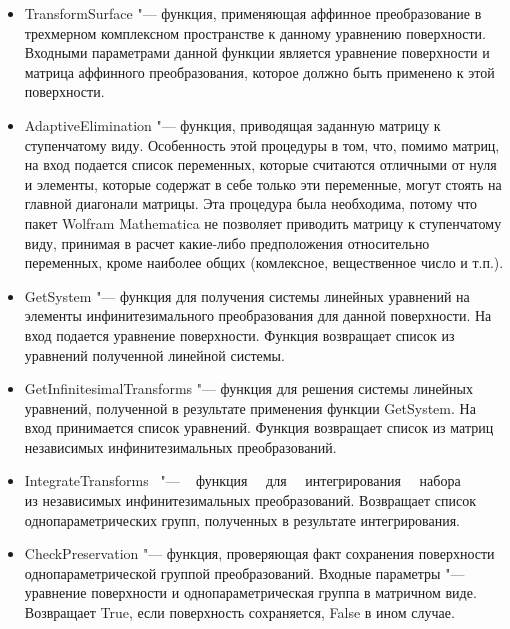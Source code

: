 \documentclass[../main.tex]{subfiles}
\begin{document}
\begin{itemize}

\item {\ttfamily TransformSurface} "--- функция, применяющая аффинное преобразование в трехмерном комплексном пространстве к данному уравнению поверхности. Входными параметрами данной функции является уравнение поверхности и матрица аффинного преобразования, которое должно быть применено к этой поверхности.

\item {\ttfamily AdaptiveElimination} "--- функция, приводящая заданную матрицу к ступенчатому виду. Особенность этой процедуры в том, что, помимо матриц, на вход подается список переменных, которые считаются отличными от нуля и элементы, которые содержат в себе только эти переменные, могут стоять на главной диагонали матрицы. Эта процедура была необходима, потому что пакет {\ttfamily Wolfram Mathematica} не позволяет приводить матрицу к ступенчатому виду, принимая в расчет какие-либо предположения относительно переменных, кроме наиболее общих (комлексное, вещественное число и т.п.).

\item {\ttfamily GetSystem} "---  функция для получения системы линейных уравнений на элементы инфинитезимального преобразования для данной поверхности. На вход подается уравнение поверхности. Функция возвращает список из уравнений полученной линейной системы.

\item {\ttfamily GetInfinitesimalTransforms} "--- функция для решения системы линейных уравнений, полученной в результате применения функции {\ttfamily GetSystem}. На вход принимается список уравнений. Функция возвращает список из матриц независимых инфинитезимальных преобразований.

\item {\ttfamily IntegrateTransforms}~ "--- ~ функция~~ для ~~интегрирования ~~набора\\ из независимых инфинитезимальных преобразований. Возвращает список однопараметрических групп, полученных в результате интегрирования. 

\item {\ttfamily CheckPreservation} "--- функция, проверяющая факт сохранения поверхности однопараметрической группой преобразований. Входные параметры "--- уравнение поверхности и однопараметрическая группа в матричном виде. Возвращает {\ttfamily True}, если поверхность сохраняется, {\ttfamily False} в ином случае.

\end{itemize}
\end{document}
